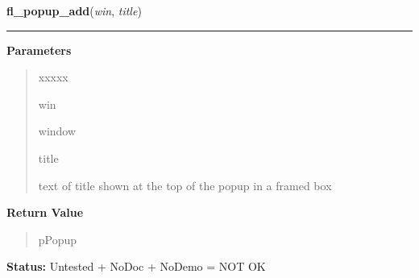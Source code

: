     \vspace{0.5ex}

\hspace{.8\funcindent}\begin{boxedminipage}{\funcwidth}

    \raggedright \textbf{fl\_popup\_add}(\textit{win}, \textit{title})

    \vspace{-1.5ex}

    \rule{\textwidth}{0.5\fboxrule}
\setlength{\parskip}{2ex}
\setlength{\parskip}{1ex}
      \textbf{Parameters}
      \vspace{-1ex}

      \begin{quote}
        \begin{Ventry}{xxxxx}

          \item[win]

          window

          \item[title]

          text of title shown at the top of the popup in a framed box

        \end{Ventry}

      \end{quote}

      \textbf{Return Value}
    \vspace{-1ex}

      \begin{quote}
      pPopup

      \end{quote}

\textbf{Status:} Untested + NoDoc + NoDemo = NOT OK



    \end{boxedminipage}

    \label{xformslib:flpopup:fl_popup_add_entries}

    \vspace{0.5ex}

